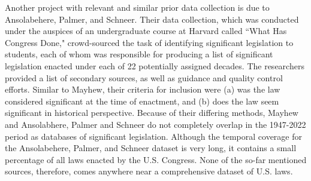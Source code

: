 \documentclass[fleqn,10pt]{wlscirep}
\begin{document}
Another project with relevant and similar prior data collection is due to Ansolabehere, Palmer, and Schneer.\cite{ansolabehere_palmer_schneer_2016,ansolabehere2018divided} Their data collection, which was conducted under the auspices of an undergraduate course at Harvard called ``What Has Congress Done," crowd-sourced the task of identifying significant legislation to students, each of whom was responsible for producing a list of significant legislation enacted under each of 22 potentially assigned decades. The researchers provided a list of secondary sources, as well as guidance and quality control efforts. Similar to Mayhew, their criteria for inclusion were (a) was the law considered significant at the time of enactment, and (b) does the law seem significant in historical perspective. Because of their differing methods, Mayhew and Ansolabhere, Palmer and Schneer do not completely overlap in the 1947-2022 period as databases of significant legislation. Although the temporal coverage for the Ansolabehere, Palmer, and Schneer dataset is very long, it contains a small percentage of all laws enacted by the U.S. Congress. None of the so-far mentioned sources, therefore, comes anywhere near a comprehensive dataset of U.S. laws. 


\end{document}
